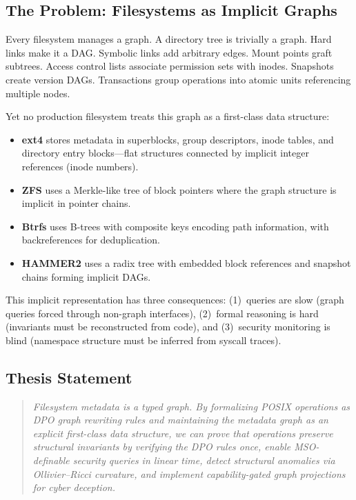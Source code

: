 \documentclass[11pt,a4paper]{article}
\theoremstyle{definition}
\begin{document}
\subsection{The Problem: Filesystems as Implicit Graphs}

Every filesystem manages a graph. A directory tree is trivially a graph.
Hard links make it a DAG. Symbolic links add arbitrary edges. Mount points
graft subtrees. Access control lists associate permission sets with inodes.
Snapshots create version DAGs. Transactions group operations into atomic
units referencing multiple nodes.

Yet no production filesystem treats this graph as a first-class data
structure:

\begin{itemize}[nosep]
  \item \textbf{ext4} stores metadata in superblocks, group descriptors,
    inode tables, and directory entry blocks---flat structures connected by
    implicit integer references (inode numbers).
  \item \textbf{ZFS} uses a Merkle-like tree of block pointers where the
    graph structure is implicit in pointer chains.
  \item \textbf{Btrfs} uses B-trees with composite keys encoding path
    information, with backreferences for deduplication.
  \item \textbf{HAMMER2} uses a radix tree with embedded block references
    and snapshot chains forming implicit DAGs.
\end{itemize}

This implicit representation has three consequences: (1)~queries are slow
(graph queries forced through non-graph interfaces), (2)~formal reasoning
is hard (invariants must be reconstructed from code), and (3)~security
monitoring is blind (namespace structure must be inferred from syscall traces).

\subsection{Thesis Statement}

\begin{quote}
\itshape
Filesystem metadata is a typed graph. By formalizing POSIX operations as
DPO graph rewriting rules and maintaining the metadata graph as an explicit
first-class data structure, we can prove that operations preserve structural
invariants by verifying the DPO rules once, enable MSO-definable security
queries in linear time, detect structural anomalies via Ollivier--Ricci
curvature, and implement capability-gated graph projections for cyber
deception.
\end{quote}
\end{document}
